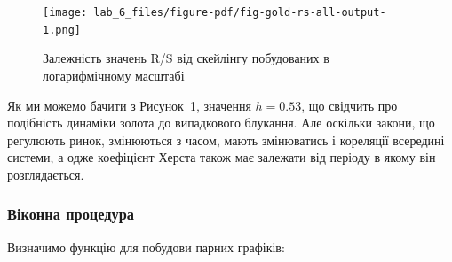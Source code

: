 \documentclass[
  letterpaper,
]{report}
\begin{document}
\begin{figure}[H]

{\centering \texttt{[image: lab\_6\_files/figure-pdf/fig-gold-rs-all-output-1.png]}

}

\caption{\label{fig-gold-rs-all}Залежність значень R/S від скейлінгу
побудованих в логарифмічному масштабі}

\end{figure}

Як ми можемо бачити з Рисунок~\ref{fig-gold-rs-all}, значення
\(h=0.53\), що свідчить про подібність динаміки золота до випадкового
блукання. Але оскільки закони, що регулюють ринок, змінюються з часом,
мають змінюватись і кореляції всередині системи, а одже коефіцієнт
Херста також має залежати від періоду в якому він розглядається.

\hypertarget{ux432ux456ux43aux43eux43dux43dux430-ux43fux440ux43eux446ux435ux434ux443ux440ux430-1}{%
\subsubsection{Віконна
процедура}\label{ux432ux456ux43aux43eux43dux43dux430-ux43fux440ux43eux446ux435ux434ux443ux440ux430-1}}

Визначимо функцію для побудови парних графіків:
\end{document}
